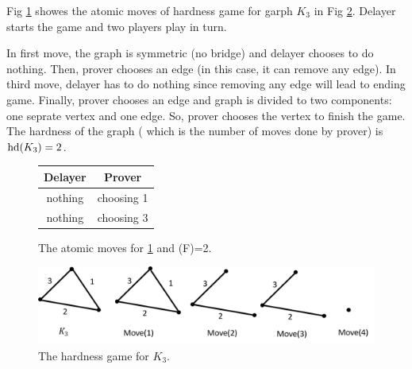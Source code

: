 \documentclass[12pt]{book}
\begin{document}
\begin{examp}\label{exp:hd1}
       Fig \ref{fig:game1} showes the atomic moves of hardness game for garph $K_3$ in Fig \ref{fig:hd1}. Delayer starts the game and two 
	   players play in turn. 
	   
	   In first move, the graph is symmetric (no bridge) and delayer chooses to do nothing. Then, prover chooses an edge (in this case, it can remove any edge). 
	   In third move, delayer has to do nothing since removing any edge will lead to ending game. Finally, prover chooses an edge and graph is divided to two components: 
	   one seprate vertex and one edge. So, prover chooses the vertex to finish the game. The hardness of the graph ( which is the number of moves done by prover) is $\operatorname{hd}(K_3)=2$.
	   
	   \begin{figure}[h]
       \centering
       \begin{tabular}{|c|c|} 
                  \hline
                  Delayer & Prover \\ \hline
                  nothing & choosing 1  \\ \hline
                  nothing & choosing 3  \\ \hline
       \end{tabular}
       \caption{The atomic moves for \ref{fig:game1} and \hardness(F)=2.}
       \label{fig:game1}
      \end{figure}
	  \begin{figure}
      \begin{center}
      \includegraphics[scale =0.6]{g1.png}
      \caption{The hardness game for $K_3$.}
	  \label{fig:hd1}
      \end{center}
      \end{figure}
\end{examp}
\end{document}

